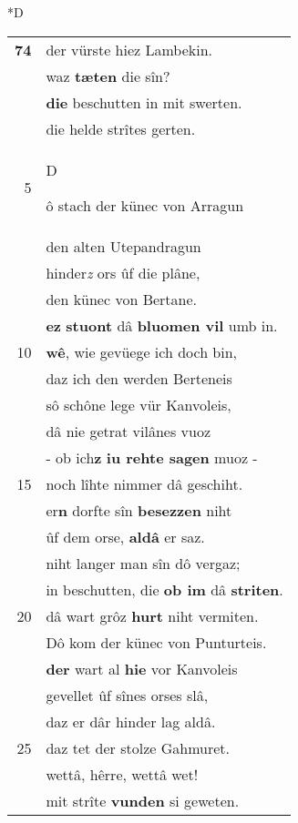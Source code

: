 \documentclass[8pt,a4paper,notitlepage]{article}
\begin{document}
\begin{table}[ht]
\begin{minipage}[t]{0.5\linewidth}
\small
\begin{center}*D
\end{center}
\begin{tabular}{rl}
\textbf{74} & der vürste hiez Lambekin.\\ 
 & waz \textbf{tæten} die sîn?\\ 
 & \textbf{die} beschutten in mit swerten.\\ 
 & die helde strîtes gerten.\\ 
5 & \begin{large}D\end{large}ô stach der künec von Arragun\\ 
 & den alten Utepandragun\\ 
 & hinder\textit{z} ors ûf die plâne,\\ 
 & den künec von Bertane.\\ 
 & \textbf{ez} \textbf{stuont} dâ \textbf{bluomen vil} umb in.\\ 
10 & \textbf{wê}, wie gevüege ich doch bin,\\ 
 & daz ich den werden Berteneis\\ 
 & sô schône lege vür Kanvoleis,\\ 
 & dâ nie getrat vilânes vuoz\\ 
 & - ob ich\textbf{z} \textbf{iu rehte sagen} muoz -\\ 
15 & noch lîhte nimmer dâ geschiht.\\ 
 & er\textbf{n} dorfte sîn \textbf{besezzen} niht\\ 
 & ûf dem orse, \textbf{aldâ} er saz.\\ 
 & niht langer man sîn dô vergaz;\\ 
 & in beschutten, die \textbf{ob im} dâ \textbf{striten}.\\ 
20 & dâ wart grôz \textbf{hurt} niht vermiten.\\ 
 & Dô kom der künec von Punturteis.\\ 
 & \textbf{der} wart al \textbf{hie} vor Kanvoleis\\ 
 & gevellet ûf sînes orses slâ,\\ 
 & daz er dâr hinder lag aldâ.\\ 
25 & daz tet der stolze Gahmuret.\\ 
 & wettâ, hêrre, wettâ wet!\\ 
 & mit strîte \textbf{vunden} si geweten.\\ 

\end{tabular}
\end{minipage}
\end{table}
\end{document}
